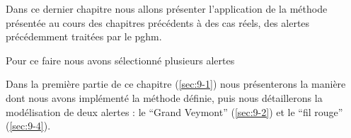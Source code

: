 Dans ce dernier chapitre nous allons présenter l'application de la
méthode présentée au cours des chapitres précédents à des cas réels,
des alertes précédemment traitées par le \ac{pghm}.

Pour ce faire nous avons sélectionné plusieurs alertes




Dans la première partie de ce chapitre (\autoref{sec:9-1}) nous
présenterons la manière dont nous avons implémenté la méthode définie,
puis nous détaillerons la modélisation de deux alertes : le
\enquote{Grand Veymont} (\autoref{sec:9-2}) et le \enquote{fil rouge}
(\autoref{sec:9-4}).

